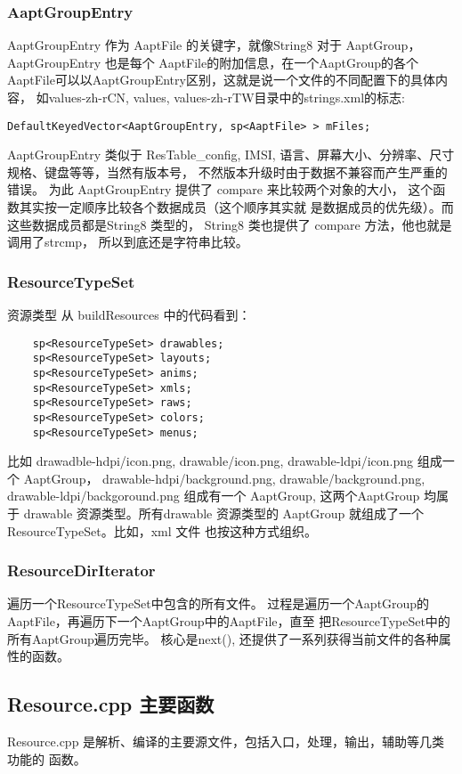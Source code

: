 \documentclass[a4paper,11pt]{article}
\begin{document}
\subsubsection{AaptGroupEntry}
AaptGroupEntry 作为 AaptFile 的关键字，就像String8 对于 AaptGroup，
AaptGroupEntry 也是每个 AaptFile的附加信息，在一个AaptGroup的各个
AaptFile可以以AaptGroupEntry区别，这就是说一个文件的不同配置下的具体内容，
如values-zh-rCN, values, values-zh-rTW目录中的strings.xml的标志:
\begin{lstlisting}[caption=AaptDir的属性]
DefaultKeyedVector<AaptGroupEntry, sp<AaptFile> > mFiles;
\end{lstlisting}


AaptGroupEntry 类似于 ResTable_config,  IMSI,
语言、屏幕大小、分辨率、尺寸规格、键盘等等，当然有版本号，
不然版本升级时由于数据不兼容而产生严重的错误。 为此
 AaptGroupEntry 提供了 compare 来比较两个对象的大小，
这个函数其实按一定顺序比较各个数据成员（这个顺序其实就
是数据成员的优先级）。而这些数据成员都是String8 类型的，
String8 类也提供了 compare 方法，他也就是调用了strcmp，
所以到底还是字符串比较。
\subsubsection{ResourceTypeSet}\label{restypeset}
资源类型
从 buildResources 中的代码看到：
\begin{lstlisting}
    sp<ResourceTypeSet> drawables;
    sp<ResourceTypeSet> layouts;
    sp<ResourceTypeSet> anims;
    sp<ResourceTypeSet> xmls;
    sp<ResourceTypeSet> raws;
    sp<ResourceTypeSet> colors;
    sp<ResourceTypeSet> menus;
\end{lstlisting}
 比如 
drawadble-hdpi/icon.png, drawable/icon.png, drawable-ldpi/icon.png
组成一个 AaptGroup， drawable-hdpi/background.png,
 drawable/background.png, drawable-ldpi/backgoround.png 组成有一个
AaptGroup, 这两个AaptGroup 均属于 drawable 资源类型。所有drawable
资源类型的 AaptGroup 就组成了一个 ResourceTypeSet。比如，xml 文件
也按这种方式组织。 
\subsubsection{ResourceDirIterator}\label{resdirit}
遍历一个ResourceTypeSet中包含的所有文件。
过程是遍历一个AaptGroup的AaptFile，再遍历下一个AaptGroup中的AaptFile，直至
把ResourceTypeSet中的所有AaptGroup遍历完毕。
核心是next(), 还提供了一系列获得当前文件的各种属性的函数。

\subsection{Resource.cpp 主要函数}
Resource.cpp\cite{1} 是解析、编译的主要源文件，包括入口，处理，输出，辅助等几类功能的
函数。
\end{document}
